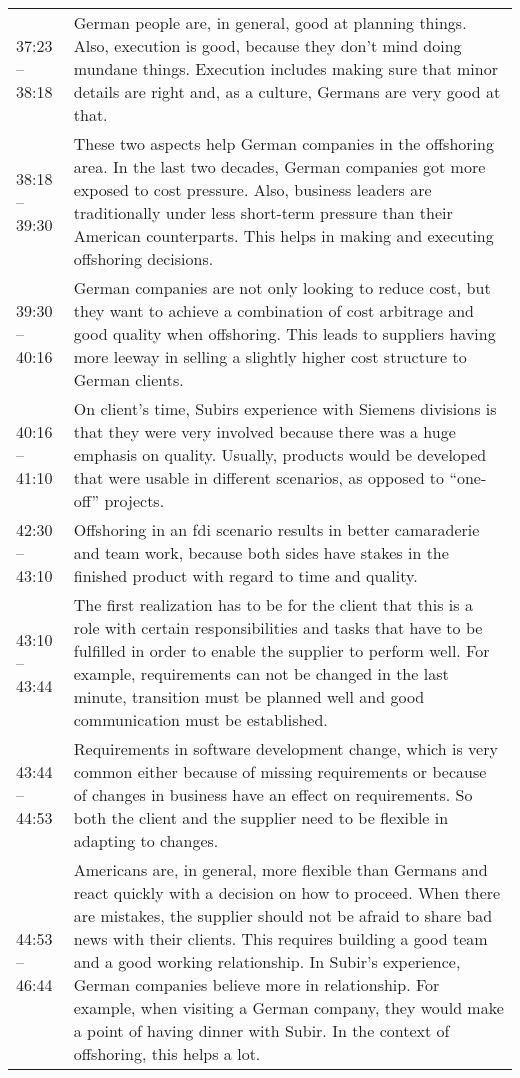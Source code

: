 \begin{appendix}
\begin{longtable}{l p{12.5cm}}
	37:23 -- 38:18&German people are, in general, good at planning things. Also,  execution is good, because they don't mind doing mundane things. Execution includes making sure that minor details are right and, as a culture, Germans are very good at that.\\
	38:18 -- 39:30&These two aspects help German companies in the offshoring area. In the last two decades, German companies got more exposed to cost pressure. Also, business leaders are traditionally under less short-term pressure than their American counterparts. This helps in making and executing offshoring decisions.\\
	39:30 -- 40:16& German companies are not only looking to reduce cost, but they want to achieve a combination of cost arbitrage and good quality when offshoring. This leads to suppliers having more leeway in selling a slightly higher cost structure to German clients.\\
	40:16 -- 41:10&On client's time, Subirs experience with Siemens divisions is that they were very involved because there was a huge emphasis on quality. Usually, products would be developed that were usable in different scenarios, as opposed to ``one-off'' projects.\\
	42:30 -- 43:10&Offshoring in an \gls{fdi} scenario results in better camaraderie and team work, because both sides have stakes in the finished product with regard to time and quality.\\
	43:10 -- 43:44&The first realization has to be for the client that this is a role with certain responsibilities and tasks that have to be fulfilled in order to enable the supplier to perform well. For example, requirements can not be changed in the last minute, transition must be planned well and good communication must be established.\\
	43:44 -- 44:53&Requirements in software development change, which is very common either because of missing requirements or because of changes in business have an effect on requirements. So both the client and the supplier need to be flexible in adapting to changes.\\
	44:53 -- 46:44&Americans are, in general, more flexible than Germans and react quickly with a decision on how to proceed. When there are mistakes, the supplier should not be afraid to share bad news with their clients. This requires building a good team and a good working relationship. In Subir's experience, German companies believe more in relationship. For example, when visiting a German company, they would make a point of having dinner with Subir. In the context of offshoring, this helps a lot.\\

\end{longtable}
\end{appendix}
